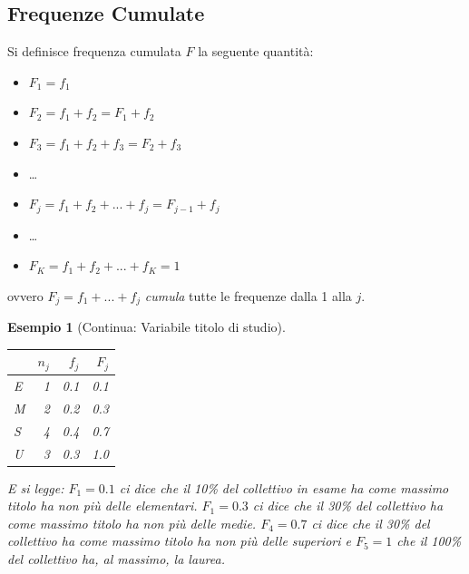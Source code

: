 \documentclass[
  11pt,
]{book}
\providecommand{\tightlist}{%
  \setlength{\itemsep}{0pt}\setlength{\parskip}{0pt}}
\theoremstyle{mytheoremstyle}
\theoremstyle{mydefstyle}
\newtheorem{example}{{Esempio}}[section]
\begin{document}
\subsection{Frequenze Cumulate}\label{frequenze-cumulate}

Si definisce frequenza cumulata \(F\) la seguente quantità:

\begin{itemize}
\tightlist
\item
  \(F_1 = f_1\)
\item
  \(F_2= f_1+f_2=F_1+f_2\)
\item
  \(F_3= f_1+f_2+f_3=F_2+f_3\)
\item
  \ldots{}
\item
  \(F_j= f_1+f_2+...+f_j=F_{j-1}+f_j\)
\item
  \ldots{}
\item
  \(F_K= f_1+f_2+...+f_K=1\)
\end{itemize}

ovvero \(F_j=f_1+...+f_j\) \emph{cumula} tutte le frequenze dalla 1 alla \(j\).

\begin{example}[Continua: Variabile titolo di studio]
\(\phantom{.}\)

\begin{center}

\begin{table}[H]
\centering
\begin{tabular}[t]{lrrr}
\toprule
  & $n_j$ & $f_j$ & $F_j$\\
\midrule
E & 1 & 0.1 & 0.1\\
M & 2 & 0.2 & 0.3\\
S & 4 & 0.4 & 0.7\\
U & 3 & 0.3 & 1.0\\
\bottomrule
\end{tabular}
\end{table}

\end{center}

E si legge: \(F_1=0.1\) ci dice che il 10\% del collettivo in esame ha come massimo titolo ha non più delle elementari. \(F_1=0.3\) ci dice che il 30\% del collettivo ha come massimo titolo ha non più delle medie. \(F_4=0.7\) ci dice che il 30\% del collettivo ha come massimo titolo ha non più delle superiori e \(F_5=1\) che il 100\% del collettivo ha, al massimo, la laurea.
\end{example}
\end{document}
